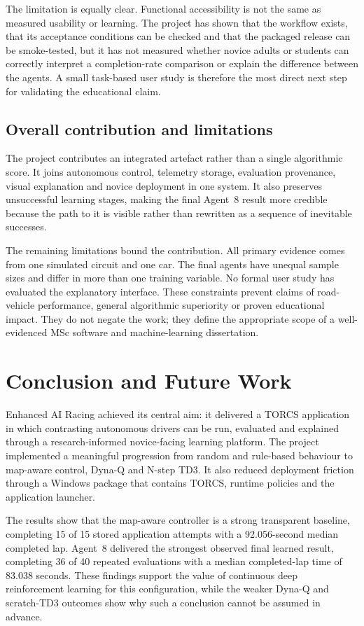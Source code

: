 The limitation is equally clear. Functional accessibility is not the same as measured usability or learning. The project has shown that the workflow exists, that its acceptance conditions can be checked and that the packaged release can be smoke-tested, but it has not measured whether novice adults or students can correctly interpret a completion-rate comparison or explain the difference between the agents. A small task-based user study is therefore the most direct next step for validating the educational claim.

\subsection{Overall contribution and limitations}

The project contributes an integrated artefact rather than a single algorithmic score. It joins autonomous control, telemetry storage, evaluation provenance, visual explanation and novice deployment in one system. It also preserves unsuccessful learning stages, making the final Agent~8 result more credible because the path to it is visible rather than rewritten as a sequence of inevitable successes.

The remaining limitations bound the contribution. All primary evidence comes from one simulated circuit and one car. The final agents have unequal sample sizes and differ in more than one training variable. No formal user study has evaluated the explanatory interface. These constraints prevent claims of road-vehicle performance, general algorithmic superiority or proven educational impact. They do not negate the work; they define the appropriate scope of a well-evidenced MSc software and machine-learning dissertation.

\section{Conclusion and Future Work}
\label{ch:conclusion}

Enhanced AI Racing achieved its central aim: it delivered a TORCS application in which contrasting autonomous drivers can be run, evaluated and explained through a research-informed novice-facing learning platform. The project implemented a meaningful progression from random and rule-based behaviour to map-aware control, Dyna-Q and N-step TD3. It also reduced deployment friction through a Windows package that contains TORCS, runtime policies and the application launcher.

The results show that the map-aware controller is a strong transparent baseline, completing 15 of 15 stored application attempts with a 92.056-second median completed lap. Agent~8 delivered the strongest observed final learned result, completing 36 of 40 repeated evaluations with a median completed-lap time of 83.038 seconds. These findings support the value of continuous deep reinforcement learning for this configuration, while the weaker Dyna-Q and scratch-TD3 outcomes show why such a conclusion cannot be assumed in advance.

